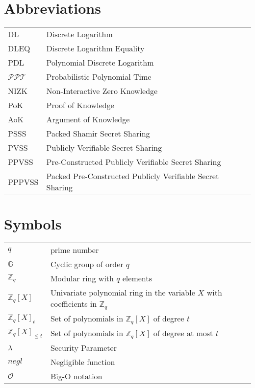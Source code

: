 \documentclass[master=mcs]{kulemt}
\begin{document}
\section*{Abbreviations}
\begin{flushleft}
  \renewcommand{\arraystretch}{1.1}
  \begin{tabularx}{\textwidth}{@{}p{12mm}X@{}}
    DL & Discrete Logarithm \\
    DLEQ & Discrete Logarithm Equality \\
    PDL & Polynomial Discrete Logarithm \\
    $\mathcal{PPT}$ & Probabilistic Polynomial Time \\
    NIZK   & Non-Interactive Zero Knowledge \\
    PoK   & Proof of Knowledge \\
    AoK  & Argument of Knowledge \\
    PSSS & Packed Shamir Secret Sharing \\
    PVSS & Publicly Verifiable Secret Sharing \\
    PPVSS & Pre-Constructed Publicly Verifiable Secret Sharing \\
    PPPVSS & Packed Pre-Constructed Publicly Verifiable Secret Sharing \\
  \end{tabularx}
\end{flushleft}
\section*{Symbols}
\begin{flushleft}
  \renewcommand{\arraystretch}{1.1}
  \begin{tabularx}{\textwidth}{@{}p{12mm}X@{}}
    $q$ & prime number \\
    $\mathbb{G}$   & Cyclic group of order $q$ \\
    $\mathbb{Z}_q$   & Modular ring with $q$ elements \\
    $\mathbb{Z}_q[X]$  & Univariate polynomial ring in the variable $X$ with coefficients in $\mathbb{Z}_q$ \\
    $\mathbb{Z}_q[X]_t$ & Set of polynomials in $\mathbb{Z}_q[X]$ of degree $t$ \\
    $\mathbb{Z}_q[X]_{\leq t}$ & Set of polynomials in $\mathbb{Z}_q[X]$ of degree at most $t$ \\
    $\lambda$   & Security Parameter \\
    $negl$ & Negligible function \\
    $\mathcal{O}$ & Big-O notation \\
  \end{tabularx}
\end{flushleft}
\end{document}
